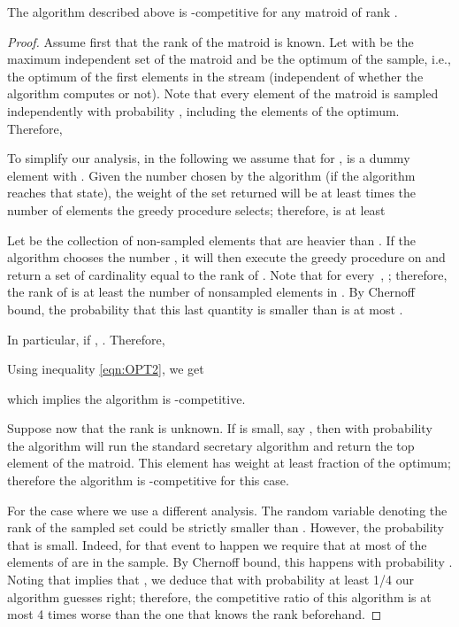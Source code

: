 \documentclass[letterpaper,11pt]{article}
\theoremstyle{definition}
\theoremstyle{remark}
\begin{document}
\begin{thm}\label{thm:log}
  The algorithm described above is -competitive for any matroid of rank .
\end{thm}
\begin{proof}
Assume first that the rank  of the matroid is known. Let  with  be the maximum independent set of the matroid and  be the optimum of the sample, i.e., the optimum of the first  elements in the stream (independent of whether the algorithm computes  or not). Note that every element of the matroid is sampled independently with probability , including the elements of the optimum. Therefore,



To simplify our analysis, in the following we assume that for ,  is a dummy element with . Given the number  chosen by the algorithm (if the algorithm reaches that state), the weight of the set returned will be at least  times the number of elements the greedy procedure selects; therefore,  is at least


Let  be the collection of non-sampled elements that are heavier than . If the algorithm chooses the number , it will then execute the greedy procedure on  and return a set of cardinality equal to the rank of . Note that for every~, ; therefore, the rank of  is at least the number of nonsampled elements in . By Chernoff bound, the probability that this last quantity is smaller than  is at most .

In particular, if ,  . Therefore,

Using inequality \eqref{eqn:OPT2}, we get

which implies the algorithm is -competitive.

Suppose now that the rank  is unknown. If  is small, say , then with probability  the algorithm will run the standard secretary algorithm and return the top element of the matroid. This element has weight at least  fraction of the optimum; therefore the algorithm is -competitive for this case.

For the case where  we use a different analysis.  The random variable  denoting the rank of the sampled set could be strictly smaller than . However, the probability that  is small. Indeed, for that event to happen we require that at most  of the elements of  are in the sample. By Chernoff bound, this happens with probability . Noting that  implies that , we deduce that with probability at least 1/4 our algorithm guesses  right; therefore, the competitive ratio of this algorithm is at most 4 times worse than the one that knows the rank beforehand.
\end{proof}



\end{document}
